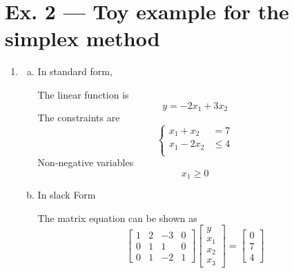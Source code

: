 \documentclass[12pt, a4paper]{article}
\begin{document}
\section*{Ex. 2 --- Toy example for the simplex method}
\begin{enumerate}
    \item \begin{enumerate}[a)]
        \item In standard form, 
              
              The linear function is
              \[y = -2x_1 + 3x_2\]
              The constraints are
              \[
                \begin{cases}
                    x_1 + x_2 &= 7\\
                    x_1 - 2x_2 &\leq 4\\
                \end{cases} 
              \]
              Non-negative variables
              \[x_1 \geq 0\]
        \item In slack Form
        
              The matrix equation can be shown as
              \[
                \begin{bmatrix}
                    1 & 2 & -3 & 0 \\
                    0 & 1 & 1  & 0 \\
                    0 & 1 & -2 & 1
                \end{bmatrix}
                \begin{bmatrix}
                    y\\ x_1\\ x_2\\ x_3
                \end{bmatrix}
                =
                \begin{bmatrix}
                    0\\ 7\\ 4
                \end{bmatrix}
              \]


\end{enumerate}
\end{enumerate}
\end{document}
